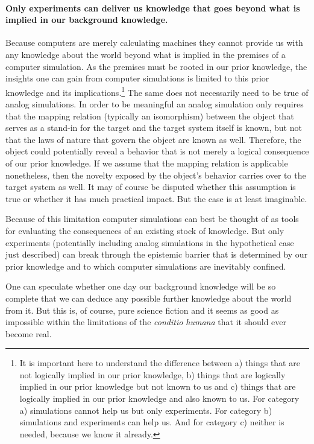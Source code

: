 \documentclass[12pt, a4paper]{article}
\numberwithin{equation}{section}
\begin{document}
\paragraph{Only experiments can deliver us knowledge that goes beyond what is implied in our background knowledge.}

Because computers are merely calculating machines they cannot provide us with any knowledge about the world beyond what is implied in the premises of a computer simulation. As the premises must be rooted in our prior knowledge, the insights one can gain from computer simulations is limited to this prior knowledge and its implications.\footnote{It is important here to understand the difference between a) things that are not logically implied in our prior knowledge, b) things that are logically implied in our prior knowledge but not known to us and c) things that are logically implied in our prior knowledge and also known to us. For category a) simulations cannot help us but only experiments. For category b) simulations and experiments can help us. And for category c) neither is needed, because we know it already.} The same does not necessarily need to be true of analog simulations. In order to be meaningful an analog simulation only requires that the mapping relation (typically an isomorphism) between the object that serves as a stand-in for the target and the target system itself is known, but not that the laws of nature that govern the object are known as well. Therefore, the object could potentially reveal a behavior that is not merely a logical consequence of our prior knowledge. If we assume that the mapping relation is applicable nonetheless, then the novelty exposed by the object's behavior carries over to the target system as well. It may of course be disputed whether this assumption is true or whether it has much practical impact. But the case is at least imaginable.

Because of this limitation computer simulations can best be thought of as tools for evaluating the consequences of an existing stock of knowledge. But only experiments (potentially including analog simulations in the hypothetical case just described) can break through the epistemic barrier that is determined by our prior knowledge and to which computer simulations are inevitably confined.

One can speculate whether one day our background knowledge will be so complete that we can deduce any possible further knowledge about the world from it. But this is, of course, pure science fiction and it seems as good as impossible within the limitations of the {\em conditio humana} that it should ever become real.
\end{document}

